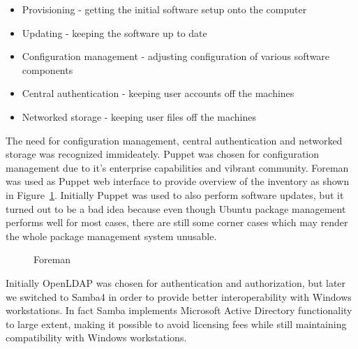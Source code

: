 \documentclass{article}
\begin{document}
\begin{itemize}
\item Provisioning - getting the initial software setup onto the computer
\item Updating - keeping the software up to date
\item Configuration management - adjusting configuration of various software components
\item Central authentication - keeping user accounts off the machines
\item Networked storage - keeping user files off the machines
\end{itemize}

The need for configuration management, central authentication
and networked storage was recognized immideately.
Puppet was chosen for configuration management due to it's
enterprise capabilities and vibrant community.
Foreman was used as Puppet web interface to provide
overview of the inventory as shown in Figure~\ref{fig:foreman}.
Initially Puppet was used to also perform software updates, but
it turned out to be a bad idea because even though Ubuntu package
management performs well for most cases, there are still some
corner cases which may render the whole package management
system unusable.

\begin{figure}[!htb]
\centering
{}
\caption{Foreman}
\label{fig:foreman}
\end{figure}

Initially OpenLDAP was chosen for authentication and authorization,
but later we switched to Samba4 in order to provide better
interoperability with Windows workstations.
In fact Samba implements Microsoft Active Directory functionality
to large extent,
making it possible to avoid licensing fees while still maintaining
compatibility with Windows workstations.
\end{document}
